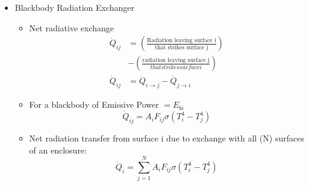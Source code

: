 \begin{itemize}
\begin{itemize}
\begin{figure}[H]
        \end{figure}
    \end{itemize}
    \item Blackbody Radiation Exchanger
    \begin{itemize}
        \item Net radiative exchange
        \begin{align*}
            \dot{Q}_{ij} &= \left(\frac{\text{Radiation leaving surface i}}{\text{that strikes surface j}}\right) \\
            &- \left(\frac{\text{radiation leaving surface j}}{that strikes surface i}\right)\\
            \dot{Q}_{ij} &= \dot{Q}_{i\to j} - \dot{Q}_{j \to i}
        \end{align*}
        \item For a blackbody of Emissive Power $=E_{bi}$
        \begin{equation*}
            \dot{Q}_{ij} = A_i F_{ij} \sigma (T_i^4-T_j^4)
        \end{equation*}
        \item Net radiation transfer from surface i due to exchange with all (N) surfaces of an enclosure:
        \begin{equation*}
            \dot{Q}_i = \sum_{j=1}^{N} A_i F_{ij} \sigma (T_i^4-T_j^4) 
        \end{equation*}
    \end{itemize}
\end{itemize}